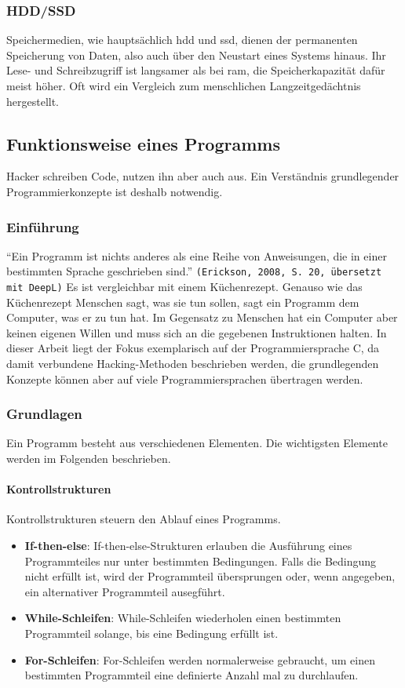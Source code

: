 \documentclass[11pt, a4paper]{article}
\begin{document}
\subsubsection{HDD/SSD}
Speichermedien, wie hauptsächlich \gls{hdd} und \gls{ssd}, dienen der permanenten Speicherung von Daten, also auch über den Neustart eines Systems hinaus. Ihr Lese- und Schreibzugriff ist langsamer als bei \gls{ram}, die Speicherkapazität dafür meist höher. Oft wird ein Vergleich zum menschlichen Langzeitgedächtnis hergestellt. 

\subsection{Funktionsweise eines Programms}\label{subsec:funktionsweise-eines-programmes}
Hacker schreiben Code, nutzen ihn aber auch aus. Ein Verständnis grundlegender Programmierkonzepte ist deshalb notwendig.
\subsubsection{Einführung}
``Ein Programm ist nichts anderes als eine Reihe von Anweisungen, die in einer bestimmten Sprache geschrieben sind.'' \texttt{(Erickson, 2008, S. 20, übersetzt mit DeepL)} \cite{erickson2008hacking} Es ist vergleichbar mit einem Küchenrezept. Genauso wie das Küchenrezept Menschen sagt, was sie tun sollen, sagt ein Programm dem Computer, was er zu tun hat. Im Gegensatz zu Menschen hat ein Computer aber keinen eigenen Willen und muss sich an die gegebenen Instruktionen halten. In dieser Arbeit liegt der Fokus exemplarisch auf der Programmiersprache C, da damit verbundene Hacking-Methoden beschrieben werden, die grundlegenden Konzepte können aber auf viele Programmiersprachen übertragen werden.
\subsubsection{Grundlagen}
Ein Programm besteht aus verschiedenen Elementen. Die wichtigsten Elemente werden im Folgenden beschrieben.

\paragraph{Kontrollstrukturen}
Kontrollstrukturen steuern den Ablauf eines Programms.
\begin{itemize}
	\item \textbf{If-then-else}: If-then-else-Strukturen erlauben die Ausführung eines Programmteiles nur unter bestimmten Bedingungen. Falls die Bedingung nicht erfüllt ist, wird der Programmteil übersprungen oder, wenn angegeben, ein alternativer Programmteil ausegführt.
	\item \textbf{While-Schleifen}: While-Schleifen wiederholen einen bestimmten Programmteil solange, bis eine Bedingung erfüllt ist. 
	\item \textbf{For-Schleifen}: For-Schleifen werden normalerweise gebraucht, um einen bestimmten Programmteil eine definierte Anzahl mal zu durchlaufen.
\end{itemize}
\end{document}
